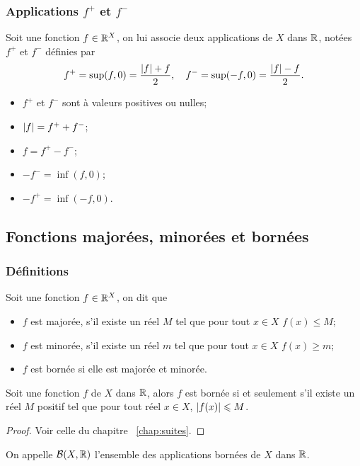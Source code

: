 \subsubsection{Applications \(f^+\) et \(f^-\)}

\begin{defdef}
  Soit une fonction \(f \in \mathbb{R}^X\), on lui associe deux applications de \(X\) 
  dans \(\mathbb{R}\), notées \(f^+\) et \(f^-\) définies par
  \begin{equation}
    f^+=\sup(f,0)=\frac{\left\lvert f\right\rvert+f}{2}, \quad f^-=\sup(-f,0)=\frac{\left\lvert f\right\rvert-f}{2}.
  \end{equation}
\end{defdef}
\begin{prop}[Propriétés]
  \begin{itemize}
    \item \(f^+\) et \(f^-\) sont à valeurs positives ou nulles;
    \item \(\left\lvert f\right\rvert=f^++f^-\);
    \item \(f=f^+-f^-\);
    \item \(-f^-=\inf(f,0)\);
    \item \(-f^+=\inf(-f,0)\).
  \end{itemize}
\end{prop}

\subsection{Fonctions majorées, minorées et bornées}

\subsubsection{Définitions}
\begin{defdef}
  Soit une fonction \(f \in \mathbb{R}^X\), on dit que
  \begin{itemize}
    \item \(f\) est majorée, s'il existe un réel \(M\) tel que pour tout \(x \in 
      X\) \(f(x) \leqslant M\);
    \item \(f\) est minorée, s'il existe un réel \(m\) tel que pour tout \(x \in 
      X\) \(f(x) \geqslant m\);
    \item \(f\) est bornée si elle est majorée et minorée.
  \end{itemize}
\end{defdef}
\begin{prop}
  Soit une fonction \(f\) de \(X\) dans \(\mathbb{R}\), alors \(f\) est bornée si et 
  seulement s'il existe un réel \(M\) positif tel que pour tout réel \(x \in 
  X\), \(\left\lvert f(x)\right\rvert \leqslant M\).
\end{prop}
\begin{proof}
  Voir celle du chapitre~
  \ref{chap:suites}.
\end{proof}
\begin{defdef}
  On appelle \(\mathcal{B}(X,\mathbb{R})\) l'ensemble des applications bornées de \(X\) dans 
  \(\mathbb{R}\).
\end{defdef}

